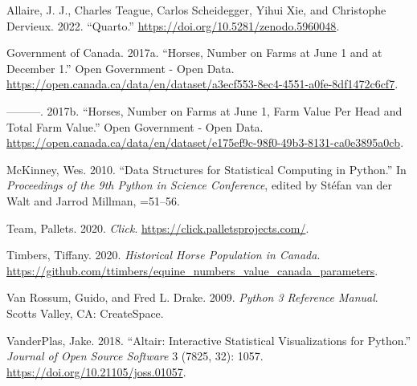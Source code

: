 \documentclass[
  letterpaper,
  DIV=11,
  numbers=noendperiod]{scrartcl}
\newlength{\cslhangindent}
\newenvironment{CSLReferences}[2] %
 {\begin{list}{}{%
  \setlength{\itemindent}{0pt}
  \setlength{\leftmargin}{0pt}
  \setlength{\parsep}{0pt}
  \ifodd #1
   \setlength{\leftmargin}{\cslhangindent}
   \setlength{\itemindent}{-1\cslhangindent}
  \fi
  \setlength{\itemsep}{#2\baselineskip}}}
 {\end{list}}
\begin{document}
\label{refs}
\begin{CSLReferences}{1}{0}
Allaire, J. J., Charles Teague, Carlos Scheidegger, Yihui Xie, and
Christophe Dervieux. 2022. {``{Quarto}.''}
\url{https://doi.org/10.5281/zenodo.5960048}.

Government of Canada. 2017a. {``Horses, Number on Farms at June 1 and at
December 1.''} Open Government - Open Data.
\url{https://open.canada.ca/data/en/dataset/a3ecf553-8ec4-4551-a0fe-8df1472c6cf7}.

---------. 2017b. {``Horses, Number on Farms at June 1, Farm Value Per
Head and Total Farm Value.''} Open Government - Open Data.
\url{https://open.canada.ca/data/en/dataset/e175ef9c-98f0-49b3-8131-ca0e3895a0cb}.

McKinney, Wes. 2010. {``Data Structures for Statistical Computing in
Python.''} In \emph{Proceedings of the 9th Python in Science
Conference}, edited by Stéfan van der Walt and Jarrod Millman, =51--56.

Team, Pallets. 2020. \emph{Click}.
\url{https://click.palletsprojects.com/}.

Timbers, Tiffany. 2020. \emph{Historical Horse Population in Canada}.
\url{https://github.com/ttimbers/equine_numbers_value_canada_parameters}.

Van Rossum, Guido, and Fred L. Drake. 2009. \emph{Python 3 Reference
Manual}. Scotts Valley, CA: CreateSpace.

VanderPlas, Jake. 2018. {``Altair: Interactive Statistical
Visualizations for Python.''} \emph{Journal of Open Source Software} 3
(7825, 32): 1057. \url{https://doi.org/10.21105/joss.01057}.

\end{CSLReferences}
\end{document}
